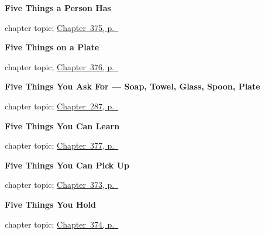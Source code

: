 \noindent\begin{minipage}[t]{\linewidth}
\raggedright
\textbf{Five Things a Person Has}\par
\footnotesize chapter topic; \hyperref[ch:la-una-y-el-labio]{Chapter~375, p.~\pageref*{ch:la-una-y-el-labio}}
\end{minipage}\par\smallskip

\noindent\begin{minipage}[t]{\linewidth}
\raggedright
\textbf{Five Things on a Plate}\par
\footnotesize chapter topic; \hyperref[ch:la-harina-y-la-uva]{Chapter~376, p.~\pageref*{ch:la-harina-y-la-uva}}
\end{minipage}\par\smallskip

\noindent\begin{minipage}[t]{\linewidth}
\raggedright
\textbf{Five Things You Ask For --- Soap, Towel, Glass, Spoon, Plate}\par
\footnotesize chapter topic; \hyperref[ch:cinco-cosas]{Chapter~287, p.~\pageref*{ch:cinco-cosas}}
\end{minipage}\par\smallskip

\noindent\begin{minipage}[t]{\linewidth}
\raggedright
\textbf{Five Things You Can Learn}\par
\footnotesize chapter topic; \hyperref[ch:la-letra-y-la-frase]{Chapter~377, p.~\pageref*{ch:la-letra-y-la-frase}}
\end{minipage}\par\smallskip

\noindent\begin{minipage}[t]{\linewidth}
\raggedright
\textbf{Five Things You Can Pick Up}\par
\footnotesize chapter topic; \hyperref[ch:el-oro-y-la-botella]{Chapter~373, p.~\pageref*{ch:el-oro-y-la-botella}}
\end{minipage}\par\smallskip

\noindent\begin{minipage}[t]{\linewidth}
\raggedright
\textbf{Five Things You Hold}\par
\footnotesize chapter topic; \hyperref[ch:el-lapiz-y-el-cepillo]{Chapter~374, p.~\pageref*{ch:el-lapiz-y-el-cepillo}}
\end{minipage}\par\smallskip

